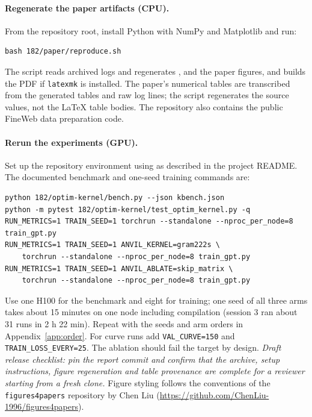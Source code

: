 \documentclass{article}
\begin{document}
\paragraph{Regenerate the paper artifacts (CPU).} From the repository root, install Python with NumPy and Matplotlib and run:
\begin{Verbatim}[fontsize=\small]
bash 182/paper/reproduce.sh
\end{Verbatim}
The script reads archived logs and regenerates ,  and the paper figures, and builds the PDF if \texttt{latexmk} is installed. The paper's numerical tables are transcribed from the generated tables and raw log lines; the script regenerates the source values, not the LaTeX table bodies. The repository also contains the public FineWeb data preparation code.

\paragraph{Rerun the experiments (GPU).} Set up the repository environment using  as described in the project README. The documented benchmark and one-seed training commands are:
\begin{Verbatim}[fontsize=\scriptsize]
python 182/optim-kernel/bench.py --json kbench.json
python -m pytest 182/optim-kernel/test_optim_kernel.py -q
RUN_METRICS=1 TRAIN_SEED=1 torchrun --standalone --nproc_per_node=8 train_gpt.py
RUN_METRICS=1 TRAIN_SEED=1 ANVIL_KERNEL=gram222s \
    torchrun --standalone --nproc_per_node=8 train_gpt.py
RUN_METRICS=1 TRAIN_SEED=1 ANVIL_ABLATE=skip_matrix \
    torchrun --standalone --nproc_per_node=8 train_gpt.py
\end{Verbatim}
Use one H100 for the benchmark and eight for training; one seed of all three arms takes about 15 minutes on one node including compilation (session 3 ran about 31 runs in 2 h 22 min). Repeat with the seeds and arm orders in Appendix~\ref{app:order}. For curve runs add \texttt{VAL\_CURVE=150} and \texttt{TRAIN\_LOSS\_EVERY=25}. The ablation should fail the target by design. \emph{Draft release checklist: pin the report commit and confirm that the archive, setup instructions, figure regeneration and table provenance are complete for a reviewer starting from a fresh clone.} Figure styling follows the conventions of the \texttt{figures4papers} repository by Chen Liu (\url{https://github.com/ChenLiu-1996/figures4papers}).
\end{document}
